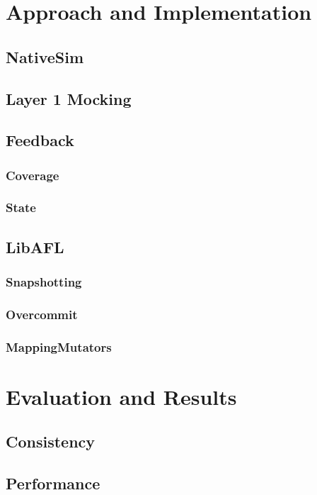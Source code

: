 \documentclass{article}
\begin{document}
\begin{multicols}{2}
  \section{Approach and Implementation}

  \subsection{NativeSim}

  \subsection{Layer 1 Mocking}

  \subsection{Feedback}

  \subsubsection{Coverage}
  \subsubsection{State}

  \subsection{LibAFL}
  \subsubsection{Snapshotting}
  \subsubsection{Overcommit}
  \subsubsection{MappingMutators}

  \section{Evaluation and Results}


  \subsection{Consistency}
  \subsection{Performance}


\end{multicols}
\end{document}
